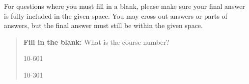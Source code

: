 \documentclass[11pt,addpoints,answers]{exam}
\begin{document}
For questions where you must fill in a blank, please make sure your final answer is fully included in the given space. You may cross out answers or parts of answers, but the final answer must still be within the given space.

\begin{quote}
\textbf{Fill in the blank:} What is the course number?

\begin{tcolorbox}[fit,height=1cm, width=4cm, blank, borderline={1pt}{-2pt},nobeforeafter]
    \begin{center}\huge10-601\end{center}
    \end{tcolorbox}\hspace{2cm}
    \begin{tcolorbox}[fit,height=1cm, width=4cm, blank, borderline={1pt}{-2pt},nobeforeafter]
    \begin{center}\huge10-301\end{center}
    \end{tcolorbox}
\end{quote}
\end{document}
